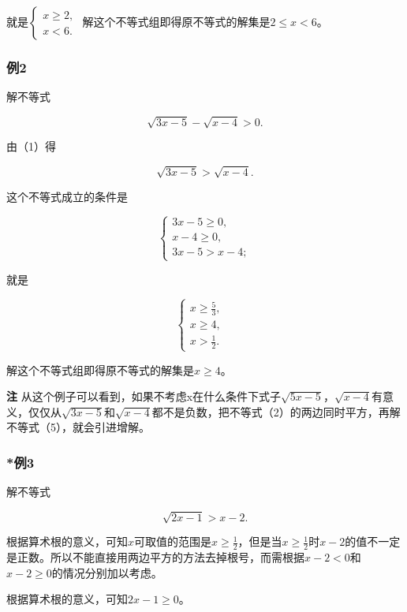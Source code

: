 就是\(\left\{ \begin{array}{l}x\geqslant 2,\\ x < 6. \end{array} \right.\)
解这个不等式组即得原不等式的解集是\(2 \leqslant x < 6\)。

\subsubsection{例2}

解不等式

\[
\sqrt{3 x - 5} - \sqrt{x - 4} > 0. \tag {1}
\]

 由（1）得

\[
\sqrt{3 x - 5} > \sqrt{x - 4}. \tag {2}
\]

这个不等式成立的条件是

\[
\left\{ \begin{array}{l} 3 x - 5 \geqslant 0, \\ x - 4 \geqslant 0, \\ 3 x - 5 > x - 4; \end{array} \right. \tag {3}
\]

就是

\[
\left\{ \begin{array}{ll} x \geqslant \frac{5}{3}, & \\ x \geqslant 4, & \\ x > \frac{1}{2}. & \end{array} \right. \tag {6}
\]

解这个不等式组即得原不等式的解集是\(x \geqslant 4\)。

\textbf{注}
从这个例子可以看到，如果不考虑x在什么条件下式子\(\sqrt{5x-5}\)，\(\sqrt{x-4}\)有意义，仅仅从\(\sqrt{3x-5}\)和\(\sqrt{x-4}\)都不是负数，把不等式（2）的两边同时平方，再解不等式（5），就会引进增解。

\subsubsection{*例3}

解不等式

\[
\sqrt{2 x - 1} > x - 2. \tag {1}
\]

根据算术根的意义，可知\(x\)可取值的范围是\(x \geqslant \frac{1}{2}\)，但是当\(x \geqslant \frac{1}{2}\)时\(x - 2\)的值不一定是正数。所以不能直接用两边平方的方法去掉根号，而需根据\(x - 2 < 0\)和\(x - 2 \geqslant 0\)的情况分别加以考虑。

 根据算术根的意义，可知\(2x - 1 \geqslant 0\)。

